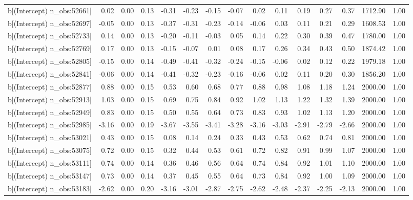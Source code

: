 \begin{table}[ht]
\begin{tabular}{rrrrrrrrrrrrrrr}
  b[(Intercept) n\_obs:52661] & 0.02 & 0.00 & 0.13 & -0.31 & -0.23 & -0.15 & -0.07 & 0.02 & 0.11 & 0.19 & 0.27 & 0.37 & 1712.90 & 1.00 \\ 
  b[(Intercept) n\_obs:52697] & -0.05 & 0.00 & 0.13 & -0.37 & -0.31 & -0.23 & -0.14 & -0.06 & 0.03 & 0.11 & 0.21 & 0.29 & 1608.53 & 1.00 \\ 
  b[(Intercept) n\_obs:52733] & 0.14 & 0.00 & 0.13 & -0.20 & -0.11 & -0.03 & 0.05 & 0.14 & 0.22 & 0.30 & 0.39 & 0.47 & 1780.00 & 1.00 \\ 
  b[(Intercept) n\_obs:52769] & 0.17 & 0.00 & 0.13 & -0.15 & -0.07 & 0.01 & 0.08 & 0.17 & 0.26 & 0.34 & 0.43 & 0.50 & 1874.42 & 1.00 \\ 
  b[(Intercept) n\_obs:52805] & -0.15 & 0.00 & 0.14 & -0.49 & -0.41 & -0.32 & -0.24 & -0.15 & -0.06 & 0.02 & 0.12 & 0.22 & 1979.18 & 1.00 \\ 
  b[(Intercept) n\_obs:52841] & -0.06 & 0.00 & 0.14 & -0.41 & -0.32 & -0.23 & -0.16 & -0.06 & 0.02 & 0.11 & 0.20 & 0.30 & 1856.20 & 1.00 \\ 
  b[(Intercept) n\_obs:52877] & 0.88 & 0.00 & 0.15 & 0.53 & 0.60 & 0.68 & 0.77 & 0.88 & 0.98 & 1.08 & 1.18 & 1.24 & 2000.00 & 1.00 \\ 
  b[(Intercept) n\_obs:52913] & 1.03 & 0.00 & 0.15 & 0.69 & 0.75 & 0.84 & 0.92 & 1.02 & 1.13 & 1.22 & 1.32 & 1.39 & 2000.00 & 1.00 \\ 
  b[(Intercept) n\_obs:52949] & 0.83 & 0.00 & 0.15 & 0.50 & 0.55 & 0.64 & 0.73 & 0.83 & 0.93 & 1.02 & 1.13 & 1.20 & 2000.00 & 1.00 \\ 
  b[(Intercept) n\_obs:52985] & -3.16 & 0.00 & 0.19 & -3.67 & -3.55 & -3.41 & -3.28 & -3.16 & -3.03 & -2.91 & -2.79 & -2.66 & 2000.00 & 1.00 \\ 
  b[(Intercept) n\_obs:53021] & 0.43 & 0.00 & 0.15 & 0.08 & 0.14 & 0.24 & 0.33 & 0.43 & 0.53 & 0.62 & 0.74 & 0.81 & 2000.00 & 1.00 \\ 
  b[(Intercept) n\_obs:53075] & 0.72 & 0.00 & 0.15 & 0.32 & 0.44 & 0.53 & 0.61 & 0.72 & 0.82 & 0.91 & 0.99 & 1.07 & 2000.00 & 1.00 \\ 
  b[(Intercept) n\_obs:53111] & 0.74 & 0.00 & 0.14 & 0.36 & 0.46 & 0.56 & 0.64 & 0.74 & 0.84 & 0.92 & 1.01 & 1.10 & 2000.00 & 1.00 \\ 
  b[(Intercept) n\_obs:53147] & 0.73 & 0.00 & 0.14 & 0.37 & 0.45 & 0.55 & 0.64 & 0.73 & 0.84 & 0.92 & 1.00 & 1.09 & 2000.00 & 1.00 \\ 
  b[(Intercept) n\_obs:53183] & -2.62 & 0.00 & 0.20 & -3.16 & -3.01 & -2.87 & -2.75 & -2.62 & -2.48 & -2.37 & -2.25 & -2.13 & 2000.00 & 1.00 \\ 

\end{tabular}
\end{table}
